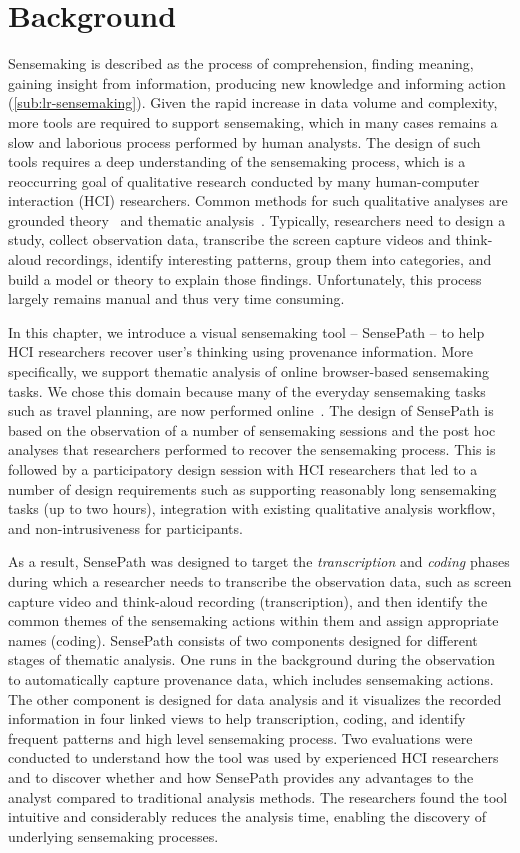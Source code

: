 \section{Background}
Sensemaking is described as the process of comprehension, finding meaning, gaining insight from information, producing new knowledge and informing action (\autoref{sub:lr-sensemaking}). Given the rapid increase in data volume and complexity, more tools are required to support sensemaking, which in many cases remains a slow and laborious process performed by human analysts. The design of such tools requires a deep understanding of the sensemaking process, which is a reoccurring goal of qualitative research conducted by many human-computer interaction (HCI) researchers. Common methods for such qualitative analyses are grounded theory~\cite{Corbin1994} and thematic analysis~\cite{Guest2011}. Typically, researchers need to design a study, collect observation data, transcribe the screen capture videos and think-aloud recordings, identify interesting patterns, group them into categories, and build a model or theory to explain those findings. Unfortunately, this process largely remains manual and thus very time consuming.

In this chapter, we introduce a visual sensemaking tool -- SensePath -- to help HCI researchers recover user's thinking using provenance information. More specifically, we support thematic analysis of online browser-based sensemaking tasks. We chose this domain because many of the everyday sensemaking tasks such as travel planning, are now performed online~\cite{Russell2008}. The design of SensePath is based on the observation of a number of sensemaking sessions and the post hoc analyses that researchers performed to recover the sensemaking process. This is followed by a participatory design session with HCI researchers that led to a number of design requirements such as supporting reasonably long sensemaking tasks (up to two hours), integration with existing qualitative analysis workflow, and non-intrusiveness for participants.

As a result, SensePath was designed to target the \emph{transcription} and \emph{coding} phases during which a researcher needs to transcribe the observation data, such as screen capture video and think-aloud recording (transcription), and then identify the common themes of the sensemaking actions within them and assign appropriate names (coding). SensePath consists of two components designed for different stages of thematic analysis. One runs in the background during the observation to automatically capture provenance data, which includes sensemaking actions. The other component is designed for data analysis and it visualizes the recorded information in four linked views to help transcription, coding, and identify frequent patterns and high level sensemaking process. Two evaluations were conducted to understand how the tool was used by experienced HCI researchers and to discover whether and how SensePath provides any advantages to the analyst compared to traditional analysis methods. The researchers found the tool intuitive and considerably reduces the analysis time, enabling the discovery of underlying sensemaking processes.


